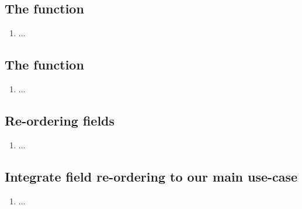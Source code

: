 \subsection{The  function}
\begin{enumerate}[resume*]
\item ...
\end{enumerate}

\subsection{The  function}
\begin{enumerate}[resume*]
\item ...
\end{enumerate}

\subsection{Re-ordering fields}
\begin{enumerate}[resume*]
\item ...
\end{enumerate}

\subsection{Integrate field re-ordering to our main use-case}
\begin{enumerate}[resume*]
\item ...
\end{enumerate}
